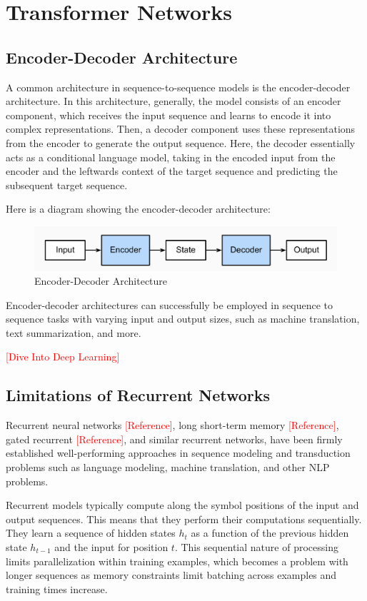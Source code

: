 \section{Transformer Networks}

\subsection{Encoder-Decoder Architecture}
A common architecture in sequence-to-sequence models is the encoder-decoder architecture. In this architecture, generally, the model consists of an encoder component, which receives the input sequence and learns to encode it into complex representations. Then, a decoder component uses these representations from the encoder to generate the output sequence. Here, the decoder essentially acts as a conditional language model, taking in the encoded input from the encoder and the leftwards context of the target sequence and predicting the subsequent target sequence. 

Here is a diagram showing the encoder-decoder architecture:

\begin{figure}[h]
    \centering
    \includegraphics[width=0.65\linewidth]{fig/enc-dec.png}
    \caption{Encoder-Decoder Architecture}
\end{figure}

Encoder-decoder architectures can successfully be employed in sequence to sequence tasks with varying input and output sizes, such as machine translation, text summarization, and more. 

\textcolor{red}{[Dive Into Deep Learning]}

\subsection{Limitations of Recurrent Networks}
Recurrent neural networks \textcolor{red}{[Reference]}, long short-term memory \textcolor{red}{[Reference]}, gated recurrent \textcolor{red}{[Reference]}, and similar recurrent networks, have been firmly established well-performing approaches in sequence modeling and transduction problems such as language modeling, machine translation, and other NLP problems.

Recurrent models typically compute along the symbol positions of the input and output sequences. This means that they perform their computations sequentially. They learn a sequence of hidden states $h_t$ as a function of the previous hidden state $h_{t-1}$ and the input for position $t$. This sequential nature of processing limits parallelization within training examples, which becomes a problem with longer sequences as memory constraints limit batching across examples and training times increase. 

